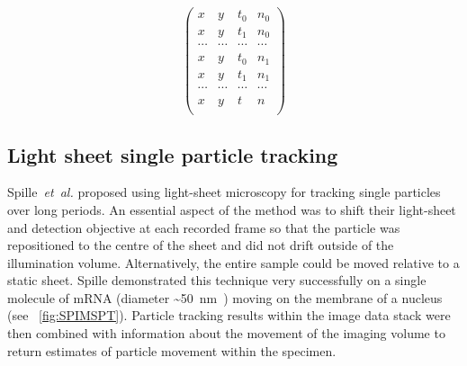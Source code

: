 \begin{figure}
\begin{subfigure}[t]{0.45\linewidth}
            \centering
            \begin{equation}
                \begin{pmatrix}
              x & y & t_0 & n_0\\
              x & y & t_1 & n_0 \\
              \cdots & \cdots & \cdots & \cdots \\
              x & y & t_0 & n_1 \\
              x & y & t_1 & n_1 \\
              \cdots & \cdots & \cdots & \cdots \\
              x & y & t & n \\
          \end{pmatrix}\label{eq:xytn_detection}
        \end{equation}
    \end{subfigure}
\end{figure}

\subsection{Light sheet single particle tracking}

Spille~\emph{et~al.} proposed using \gls{light-sheet} microscopy for tracking single particles over long periods.
An essential aspect of the method was to shift their \gls{light-sheet}
and detection objective at each recorded frame so that the particle was repositioned to the centre of the sheet and did not drift outside of the illumination volume.
Alternatively, the entire sample could be moved relative to a static sheet.
Spille demonstrated this technique very successfully on a single molecule of mRNA (diameter \SI{~50}{\nano\metre}~\cite{spille_direct_2015}) moving on the membrane of a nucleus (see \figurename~\ref{fig:SPIMSPT}).
Particle tracking results within the image data stack were then combined with information about the movement of the imaging volume to return estimates of particle movement within the specimen.

